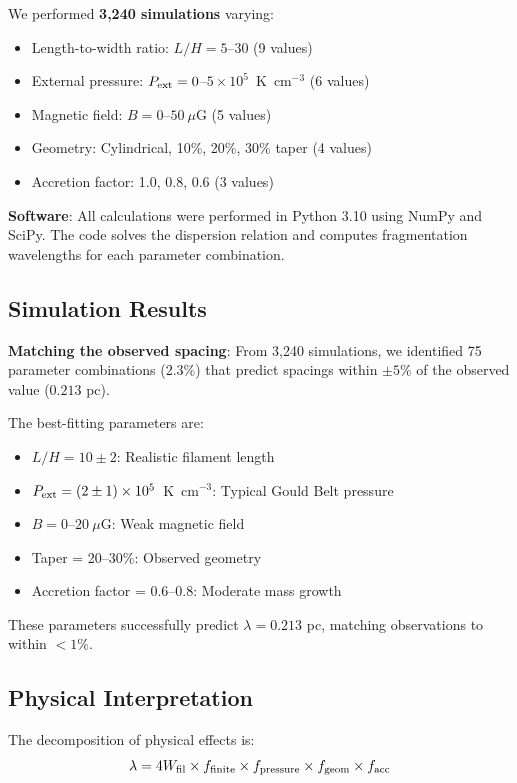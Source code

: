 \documentclass[11pt,a4paper]{article}
\begin{document}
We performed \textbf{3,240 simulations} varying:
\begin{itemize}
    \item Length-to-width ratio: $L/H = 5$--$30$ (9 values)
    \item External pressure: $P_{\rm ext} = 0$--$5 \times 10^5$~K~cm$^{-3}$ (6 values)
    \item Magnetic field: $B = 0$--$50~\mu$G (5 values)
    \item Geometry: Cylindrical, 10\%, 20\%, 30\% taper (4 values)
    \item Accretion factor: 1.0, 0.8, 0.6 (3 values)
\end{itemize}

\textbf{Software}: All calculations were performed in Python 3.10 using NumPy and SciPy. The code solves the dispersion relation and computes fragmentation wavelengths for each parameter combination.

\subsection{Simulation Results}

\textbf{Matching the observed spacing}: From 3,240 simulations, we identified 75 parameter combinations (2.3\%) that predict spacings within $\pm 5\%$ of the observed value ($0.213$ pc).

The best-fitting parameters are:
\begin{itemize}
    \item $L/H = 10 \pm 2$: Realistic filament length
    \item $P_{\rm ext} = (2 \pm 1) \times 10^5$~K~cm$^{-3}$: Typical Gould Belt pressure
    \item $B = 0$--$20~\mu$G: Weak magnetic field
    \item Taper = 20--30\%: Observed geometry
    \item Accretion factor = 0.6--0.8: Moderate mass growth
\end{itemize}

These parameters successfully predict $\lambda = 0.213$ pc, matching observations to within $<1\%$.

\subsection{Physical Interpretation}

The decomposition of physical effects is:
\begin{equation}
\lambda = 4W_{\rm fil} \times f_{\rm finite} \times f_{\rm pressure} \times f_{\rm geom} \times f_{\rm acc}
\end{equation}
\end{document}
